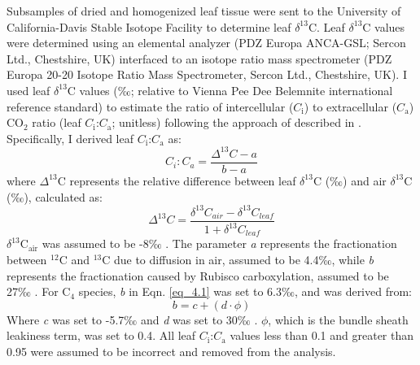 Subsamples of dried and homogenized leaf tissue were sent to the University of California-Davis Stable Isotope Facility to determine leaf $\delta^{13}$C. Leaf $\delta^{13}$C values were determined using an elemental analyzer (PDZ Europa ANCA-GSL; Sercon Ltd., Chestshire, UK) interfaced to an isotope ratio mass spectrometer (PDZ Europa 20-20 Isotope Ratio Mass Spectrometer, Sercon Ltd., Chestshire, UK). I used leaf $\delta^{13}$C values (‰; relative to Vienna Pee Dee Belemnite international reference standard) to estimate the ratio of intercellular ($C_\mathrm{i}$) to extracellular ($C_\mathrm{a}$) CO$_2$ ratio (leaf $C_\mathrm{i}$:$C_\mathrm{a}$; unitless) following the approach of  described in . Specifically, I derived leaf $C_\mathrm{i}$:$C_\mathrm{a}$ as:
\begin{equation} 
    \label{eq_4.1}
    C_i:C_a = \frac{\Delta^{13}C - a}{b - a}
\end{equation}
\noindent where $\Delta^{13}$C represents the relative difference between leaf $\delta^{13}$C (‰) and air $\delta^{13}$C (‰), calculated as:
\begin{equation}
    \label{eq_4.2}
    \Delta^{13}C = \frac{\delta^{13}C_{air} - \delta^{13}C_{leaf}}{1 + \delta^{13}C_{leaf}}
\end{equation}
\noindent $\delta^{13}\mathrm{C_{air}}$ was assumed to be -8‰ . The parameter \textit{a} represents the fractionation between $^{12}$C and $^{13}$C due to diffusion in air, assumed to be 4.4‰, while \textit{b} represents the fractionation caused by Rubisco carboxylation, assumed to be 27‰ . For C$_4$ species, \textit{b} in Eqn. \ref{eq_4.1} was set to 6.3‰, and was derived from:
\begin{equation}
    \label{eq_4.4}
    b = c + (d \cdot \phi)
\end{equation} 
\noindent Where \textit{c} was set to -5.7‰ and \textit{d} was set to 30‰ . $\phi$, which is the bundle sheath leakiness term, was set to 0.4. All leaf $C_\mathrm{i}$:$C_\mathrm{a}$ values less than 0.1 and greater than 0.95 were assumed to be incorrect and removed from the analysis.
    
